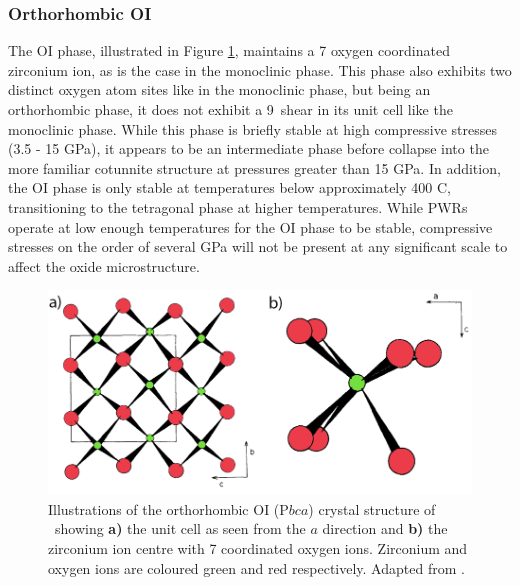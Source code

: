\subsubsection{Orthorhombic OI}

The OI phase, illustrated in Figure \ref{fig:orthorhombic_I}, maintains a 7 oxygen coordinated zirconium ion, as is the case in the monoclinic phase. This phase also exhibits two distinct oxygen atom sites like in the monoclinic phase, but being an orthorhombic phase, it does not exhibit a 9\textdegree\ shear in its unit cell like the monoclinic phase. While this phase is briefly stable at high compressive stresses (3.5 - 15 GPa), it appears to be an intermediate phase before collapse into the more familiar cotunnite structure at pressures greater than 15 GPa. In addition, the OI phase is only stable at temperatures below approximately 400 \textdegree C, transitioning to the tetragonal phase at higher temperatures. While PWRs operate at low enough temperatures for the OI phase to be stable, compressive stresses on the order of several GPa will not be present at any significant scale to affect the oxide microstructure. 


\begin{figure}[htp]
  \centering
      \includegraphics[width=\linewidth]{images/orthorhombic_I.png}
  \caption[Illustrations of the orthorhombic OI (P$bca$) crystal structure of \zirconia\ showing \textbf{a)} the unit cell viewed along the $a$ direction and \textbf{b)} the zirconium ion centre with 7 coordinated oxygen ions. Zirconium and oxygen ions are coloured green and red respectively.]{Illustrations of the orthorhombic OI (P$bca$) crystal structure of \zirconia\ showing \textbf{a)} the unit cell as seen from the $a$ direction and \textbf{b)} the zirconium ion centre with 7 coordinated oxygen ions. Zirconium and oxygen ions are coloured green and red respectively. Adapted from \cite{kisi1989crystal}.}
  \label{fig:orthorhombic_I}
\end{figure}


